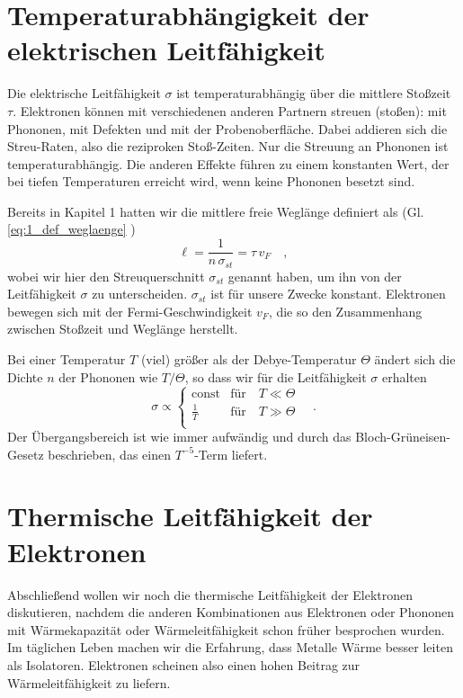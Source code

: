     


\section{Temperaturabhängigkeit der elektrischen Leitfähigkeit}

Die elektrische Leitfähigkeit $\sigma$ ist temperaturabhängig über die mittlere Stoßzeit $\tau$. Elektronen können mit verschiedenen anderen Partnern streuen (stoßen): mit Phononen, mit Defekten und mit der Probenoberfläche. Dabei addieren sich die Streu-Raten, also die reziproken Stoß-Zeiten. Nur die Streuung an Phononen ist temperaturabhängig. Die anderen Effekte führen zu einem konstanten Wert, der bei tiefen Temperaturen erreicht wird, wenn keine Phononen besetzt sind.

Bereits in Kapitel 1 hatten wir die mittlere freie Weglänge definiert als (Gl. \ref{eq:1_def_weglaenge} )
\begin{equation}
   \ell = \frac{1}{n \, \sigma_{st}} = \tau \, v_F \quad ,
\end{equation}
wobei wir hier den Streuquerschnitt $\sigma_{st}$ genannt haben, um ihn von der Leitfähigkeit $\sigma$ zu unterscheiden. $\sigma_{st}$ ist für unsere Zwecke konstant. Elektronen bewegen sich mit der Fermi-Geschwindigkeit $v_F$, die so den Zusammenhang zwischen Stoßzeit und Weglänge herstellt.

Bei einer Temperatur $T$ (viel) größer als der Debye-Temperatur $\Theta$ ändert sich die Dichte $n$ der Phononen wie $T/\Theta$, so dass wir für die Leitfähigkeit $\sigma$ erhalten
\begin{equation}
   \sigma \propto \left\{ 
      \begin{matrix}
         \text{const} & \text{für} \quad T \ll \Theta \\
   \frac{1}{T} &  \text{für} \quad T \gg \Theta \\
      \end{matrix}
   \right.  \quad .
\end{equation}
Der Übergangsbereich ist wie immer aufwändig und durch das Bloch-Grüneisen-Gesetz beschrieben, das einen $T^{-5}$-Term liefert.


\section{Thermische Leitfähigkeit der Elektronen}

Abschließend wollen wir noch die thermische Leitfähigkeit der Elektronen diskutieren, nachdem die anderen Kombinationen aus Elektronen oder Phononen mit Wärmekapazität oder Wärmeleitfähigkeit schon früher besprochen wurden. Im täglichen Leben machen wir die Erfahrung, dass Metalle Wärme besser leiten als Isolatoren. Elektronen scheinen also einen hohen Beitrag zur Wärmeleitfähigkeit zu liefern.

